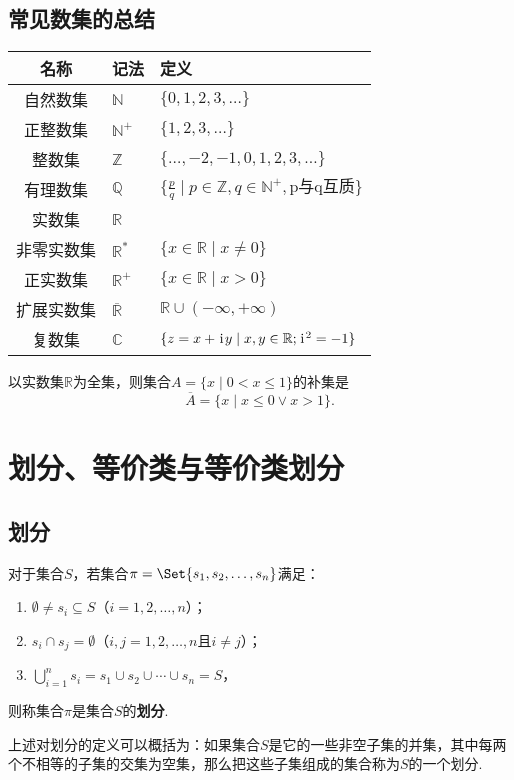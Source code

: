 \subsection{常见数集的总结}
\begin{center}
\begin{tabular}{c|l|l}
\hline
名称 & 记法 & 定义 \\ \hline
自然数集 & \(\mathbb{N}\) & \(\{ 0,1,2,3,\dotsc \}\) \\
正整数集 & \(\mathbb{N}^+\) & \(\{ 1,2,3,\dotsc \}\) \\
整数集 & \(\mathbb{Z}\) & \(\{ \dotsc,-2,-1,0,1,2,3,\dotsc \}\) \\
有理数集 & \(\mathbb{Q}\) & \(\{ \frac{p}{q} \mid p \in \mathbb{Z}, q \in \mathbb{N}^+, \text{p与q互质} \}\) \\
实数集 & \(\mathbb{R}\) \\
非零实数集 & \(\mathbb{R}^*\) & \(\{ x \in \mathbb{R} \mid x \neq 0 \}\) \\
正实数集 & \(\mathbb{R}^+\) & \(\{ x \in \mathbb{R} \mid x > 0 \}\) \\
扩展实数集 & \(\overline{\mathbb{R}}\) & \(\mathbb{R} \cup (-\infty,+\infty)\) \\
复数集 & \(\mathbb{C}\) & \(\{ z = x + \kern1pt\mathrm{i}\kern1pt y \mid x,y \in \mathbb{R}; \kern1pt\mathrm{i}\kern1pt^2 = -1 \}\) \\ \hline
\end{tabular}
\end{center}

\begin{example}
以实数集\(\mathbb{R}\)为全集，则集合\(A = \{ x \mid 0 < x \leqslant 1 \}\)的补集是\[
\overline{A} = \{ x \mid x \leqslant 0 \lor x > 1 \}.
\]
\end{example}

\section{划分、等价类与等价类划分}
\subsection{划分}
\begin{definition}
对于集合\(S\)，若集合\(\pi = \Set{ s_1,s_2,\dotsc,s_n }\)满足：
\begin{enumerate}
 \item \(\emptyset \neq s_i \subseteq S\)（\(i=1,2,\dotsc,n\)）；
 \item \(s_i \cap s_j = \emptyset\)（\(i,j=1,2,\dotsc,n\)且\(i \neq j\)）；
 \item \(\bigcup\limits_{i=1}^n s_i = s_1 \cup s_2 \cup \dotsb \cup s_n = S\)，%
\end{enumerate}
则称集合\(\pi\)是集合\(S\)的\textbf{划分}.
\end{definition}
上述对划分的定义可以概括为：如果集合\(S\)是它的一些非空子集的并集，其中每两个不相等的子集的交集为空集，那么把这些子集组成的集合称为\(S\)的一个划分.


